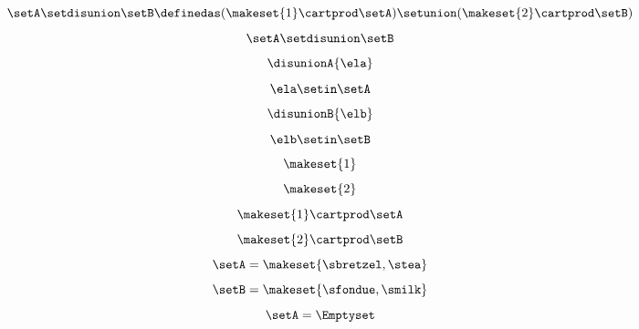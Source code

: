 {\begin{forslides}
    \begin{equation}
        \label{eq:slides_session2_59}
        \setA \setdisunion \setB \definedas (  \makeset{ 1 } \cartprod \setA) \setunion ( \makeset{2}  \cartprod \setB)
    \end{equation}
    \begin{equation}
        \label{eq:slides_session2_60}
        \setA \setdisunion \setB
    \end{equation}
    \begin{equation}
        \label{eq:slides_session2_61}
        \disunionA{\ela}
    \end{equation}
    \begin{equation}
        \label{eq:slides_session2_62}
        \ela \setin\setA
    \end{equation}
    \begin{equation}
        \label{eq:slides_session2_63}
        \disunionB{\elb}
    \end{equation}
    \begin{equation}
        \label{eq:slides_session2_64}
        \elb \setin\setB
    \end{equation}
    \begin{equation}
        \label{eq:slides_session2_65}
        \makeset{ 1 }
    \end{equation}
    \begin{equation}
        \label{eq:slides_session2_66}
        \makeset{2}
    \end{equation}
    \begin{equation}
        \label{eq:slides_session2_67}
        \makeset{ 1 }  \cartprod \setA
    \end{equation}
    \begin{equation}
        \label{eq:slides_session2_68}
        \makeset{2}  \cartprod \setB
    \end{equation}
    \begin{equation}
        \label{eq:slides_session2_69}
        \setA=\makeset{\sbretzel, \stea}
    \end{equation}
    \begin{equation}
        \label{eq:slides_session2_70}
        \setB=\makeset{\sfondue, \smilk}
    \end{equation}
    \begin{equation}
        \label{eq:slides_session2_71}
        \setA = \Emptyset
    \end{equation}
    \begin{equation}
        \label{eq:slides_session2_72}

\end{equation}
\end{forslides}}

